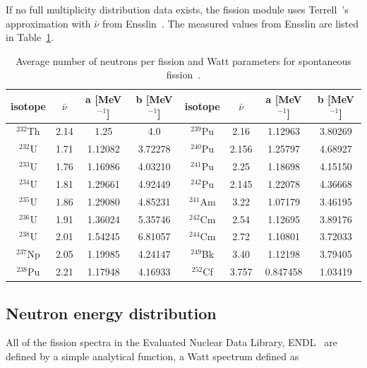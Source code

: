 If no full multiplicity distribution data exists, the fission module
uses Terrell~\cite{Terrell 1957}'s approximation with $\bar{\nu}$ from
Ensslin~\cite{Ensslin 1998}. The measured values from Ensslin are listed in 
Table~\ref{Nubar for spontaneous fission}.

\begin{table}[ht]
\footnotesize
\begin{center}
\begin{tabular}{|c|c|c|c||c|c|c|c|} \hline
isotope & $\bar{\nu}$ & a [MeV$^{-1}$] & b [MeV$^{-1}$] & isotope & $\bar{\nu}$ & a [MeV$^{-1}$] & b [MeV$^{-1}$] \\ \hline
$^{232}$Th & 2.14 & 1.25 &  4.0 & $^{239}$Pu & 2.16 & 1.12963 & 3.80269 \\
$^{232}$U  & 1.71 & 1.12082 & 3.72278 & $^{240}$Pu & 2.156 & 1.25797 & 4.68927 \\
$^{233}$U  & 1.76 & 1.16986 & 4.03210 & $^{241}$Pu & 2.25 & 1.18698 & 4.15150 \\
$^{234}$U  & 1.81 & 1.29661 & 4.92449 & $^{242}$Pu & 2.145 & 1.22078 & 4.36668 \\
$^{235}$U  & 1.86 & 1.29080 & 4.85231 & $^{241}$Am & 3.22 & 1.07179 & 3.46195 \\
$^{236}$U  & 1.91 & 1.36024 & 5.35746 & $^{242}$Cm & 2.54 & 1.12695 & 3.89176 \\
$^{238}$U  & 2.01 & 1.54245 & 6.81057 & $^{244}$Cm & 2.72 & 1.10801 & 3.72033 \\
$^{237}$Np & 2.05 & 1.19985 & 4.24147 & $^{249}$Bk & 3.40 & 1.12198 & 3.79405 \\
$^{238}$Pu & 2.21 & 1.17948 & 4.16933 & $^{252}$Cf & 3.757 & 0.847458 & 1.03419 \\ \hline
\end{tabular}
\end{center}
\caption{Average number of neutrons per fission and Watt parameters for spontaneous fission~\cite{Ensslin 1998}.}
\label{Nubar for spontaneous fission}
\end{table}

\subsection{Neutron energy distribution}\label{sec:neutron energy distribution}

All of the fission spectra in the Evaluated Nuclear Data Library,
ENDL~\cite{ENDL 1975} are defined by a simple analytical function, 
a Watt spectrum defined as

